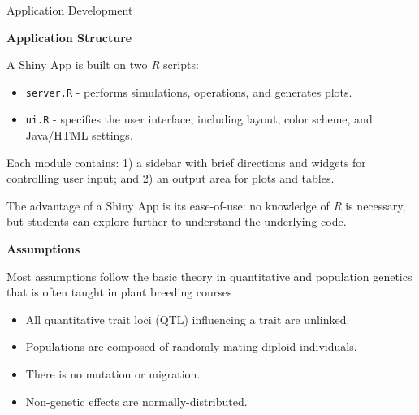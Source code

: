\documentclass[final]{beamer}
\newlength{\onecolwid}
\begin{document}
\begin{frame}[t]
\begin{columns}[t]
\begin{column}{\onecolwid}

\begin{block}{Application Development}


\textbf{Application Structure}

\vspace{0.5cm}

\begin{center}
\begin{figure}
\end{figure}
\end{center}

\vspace{0.5cm}

A Shiny App is built on two \textit{R} scripts:

\begin{itemize}
  \item \texttt{server.R} - performs simulations, operations, and generates plots.
  \item \texttt{ui.R} - specifies the user interface, including layout, color scheme, and Java/HTML settings.
\end{itemize}

\vspace{1cm}

Each module contains: 1) a sidebar with brief directions and widgets for controlling user input; and 2) an output area for plots and tables.

\vspace{1cm}

The advantage of a Shiny App is its ease-of-use: no knowledge of \textit{R} is necessary, but students can explore further to understand the underlying code.



\vspace{1cm}

\textbf{Assumptions}

\vspace{0.5cm}

Most assumptions follow the basic theory in quantitative and population genetics that is often taught in plant breeding courses \cite{Bernardo2010, Acquaah2012}

\begin{itemize}
  \item All quantitative trait loci (QTL) influencing a trait are unlinked.
  \item Populations are composed of randomly mating diploid individuals.
  \item There is no mutation or migration.
  \item Non-genetic effects are normally-distributed.
\end{itemize}



\end{block}
\end{column}
\end{columns}
\end{frame}
\end{document}
